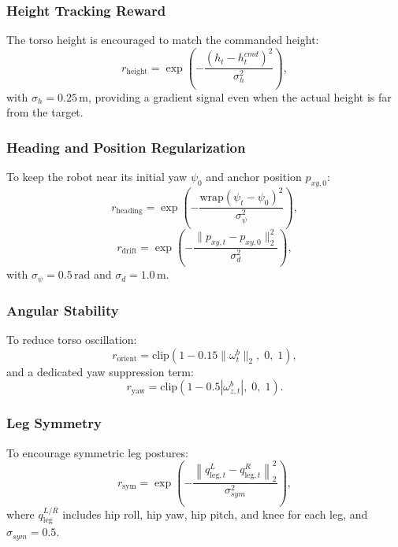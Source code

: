 \documentclass[conference]{IEEEtran}
\begin{document}
\subsubsection{Height Tracking Reward}
The torso height is encouraged to match the commanded height:
\begin{equation}
r_{\mathrm{height}} =
\exp\left(
-\frac{(h_t - h_t^{cmd})^2}{\sigma_h^2}
\right),
\label{eq:height_reward}
\end{equation}
with $\sigma_h = 0.25\,\mathrm{m}$, providing a gradient signal even when the actual height is far from the target.

\subsubsection{Heading and Position Regularization}
To keep the robot near its initial yaw $\psi_0$ and anchor position $p_{xy,0}$:
\begin{equation}
r_{\mathrm{heading}} =
\exp\left(
-\frac{\mathrm{wrap}(\psi_t - \psi_0)^2}{\sigma_\psi^2}
\right),
\label{eq:heading_reward}
\end{equation}
\begin{equation}
r_{\mathrm{drift}} =
\exp\left(
-\frac{\|p_{xy,t} - p_{xy,0}\|_2^2}{\sigma_d^2}
\right),
\label{eq:drift_reward}
\end{equation}
with $\sigma_\psi = 0.5\,\mathrm{rad}$ and $\sigma_d = 1.0\,\mathrm{m}$.

\subsubsection{Angular Stability}
To reduce torso oscillation:
\begin{equation}
r_{\mathrm{orient}} =
\mathrm{clip}\left(1 - 0.15 \|\omega_t^b\|_2,\; 0,\; 1\right),
\label{eq:orient_reward}
\end{equation}
and a dedicated yaw suppression term:
\begin{equation}
r_{\mathrm{yaw}} =
\mathrm{clip}\left(1 - 0.5 |\omega_{z,t}^b|,\; 0,\; 1\right).
\label{eq:yaw_reward}
\end{equation}

\subsubsection{Leg Symmetry}
To encourage symmetric leg postures:
\begin{equation}
r_{\mathrm{sym}} =
\exp\left(
-\frac{
\left\|
q_{\mathrm{leg},t}^L - q_{\mathrm{leg},t}^R
\right\|_2^2
}{\sigma_{sym}^2}
\right),
\label{eq:symmetry_reward}
\end{equation}
where $q_{\mathrm{leg}}^{L/R}$ includes hip roll, hip yaw, hip pitch, and knee for each leg, and $\sigma_{sym} = 0.5$.
\end{document}
